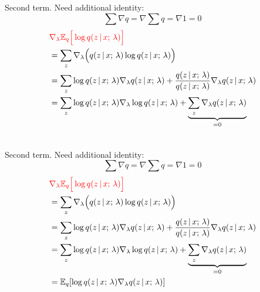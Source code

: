 \begin{frame}
Second term. Need additional identity:
\[\sum \nabla q = \nabla \sum q = \nabla 1 = 0 \]
\vspace{-5mm}
\begin{align*}
    &{\color{red} \nabla_\lambda  \E_{q}\Big[\log q(z \given x \param \lambda) \Big] }\\
    &= \sum_{z} \nabla_\lambda \Big ( q(z \given x\param \lambda) \log q(z \given x \param \lambda)\Big) \\
    &= \sum_{z}  \log q(z \given x \param \lambda) \nabla_\lambda q(z \given x \param \lambda) +  \frac{q(z \given x \param \lambda)}{q(z \given x \param \lambda)}\nabla_\lambda q(z \given x \param \lambda) \\
    &= \sum_{z}  \log q(z \given x \param \lambda) \nabla_\lambda \log q(z \given x \param \lambda) + \underbrace{\sum_z \nabla_\lambda q(z \given x \param \lambda)}_{= 0} \\
    &{\color{white}= \E_{q}[\log q (z \given x \param \lambda) \nabla_\lambda q (z \given x \param \lambda)]}
\end{align*}
\end{frame}

\begin{frame}
Second term. Need additional identity:
\[\sum \nabla q = \nabla \sum q = \nabla 1 = 0 \]
\vspace{-5mm}
\begin{align*}
    &{\color{red} \nabla_\lambda  \mathbb{E}_{q}\Big[\log q(z \,|\, x ; \, \lambda) \Big] }\\
    &= \sum_{z} \nabla_\lambda \Big ( q(z \,|\, x; \, \lambda) \log q(z \,|\, x ; \, \lambda)\Big) \\
    & = \sum_{z}  \log q(z \,|\, x ; \, \lambda) \nabla_\lambda q(z \,|\, x ; \, \lambda) +  \frac{q(z \,|\, x ; \, \lambda)}{q(z \,|\, x ; \, \lambda)}\nabla_\lambda q(z \,|\, x ; \, \lambda) \\
    &= \sum_{z}  \log q(z \,|\, x ; \, \lambda) \nabla_\lambda \log q(z \,|\, x ; \, \lambda) + \underbrace{\sum_z \nabla_\lambda q(z \,|\, x ; \, \lambda)}_{= 0} \\
    &= \mathbb{E}_{q}[\log q (z \,|\, x ; \, \lambda) \nabla_\lambda q (z \,|\, x ; \, \lambda)]
\end{align*}
\end{frame}

